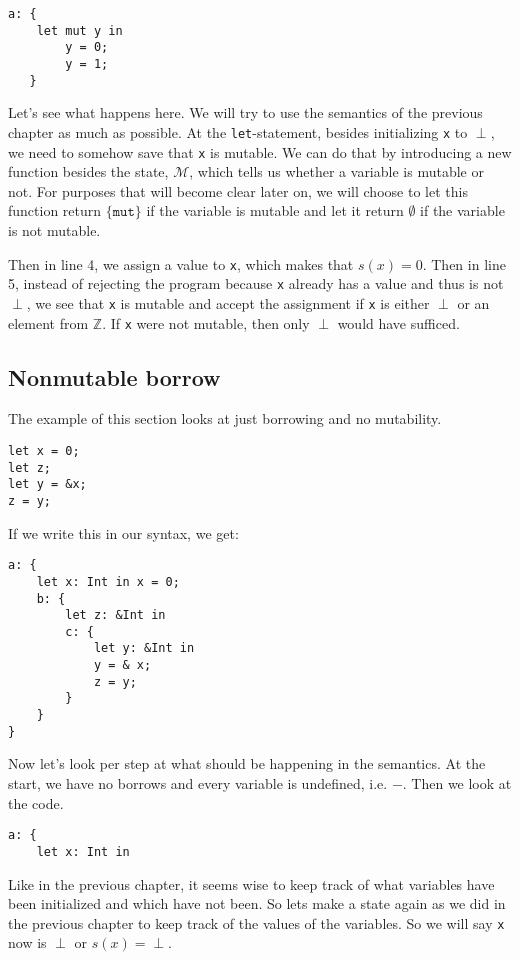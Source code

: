 \begin{verbatim}
a: {
    let mut y in 
        y = 0;
        y = 1;
   }
\end{verbatim}

Let's see what happens here. We will try to use the semantics of the previous chapter as much as possible. At the \texttt{let}-statement, besides initializing \texttt{x} to $\perp$, we need to somehow save that \texttt{x} is mutable. We can do that by introducing a new function besides the state, $\mathcal{M}$, which tells us whether a variable is mutable or not. For purposes that will become clear later on, we will choose to let this function return $\{\texttt{mut}\}$ if the variable is mutable and let it return $\emptyset$ if the variable is not mutable. 

Then in line 4, we assign a value to \texttt{x}, which makes that $s(x) = 0$. Then in line 5, instead of rejecting the program because \texttt{x} already has a value and thus is not $\perp$, we see that \texttt{x} is mutable and accept the assignment if \texttt{x} is either $\perp$ or an element from $\mathbb{Z}$. If \texttt{x} were not mutable, then only $\perp$ would have sufficed. 

\subsection{Nonmutable borrow}
The example of this section looks at just borrowing and no mutability. 
\begin{verbatim}
let x = 0;
let z;
let y = &x;
z = y;
\end{verbatim}

If we write this in our syntax, we get: 

\begin{verbatim}
a: {
    let x: Int in x = 0;
    b: {
        let z: &Int in 
        c: {
            let y: &Int in
            y = & x;
            z = y;
        }
    }
}
\end{verbatim} 

Now let's look per step at what should be happening in the semantics. At the start, we have no borrows and every variable is undefined, i.e. $-$. Then we look at the code. 

\begin{verbatim}
a: {
    let x: Int in 
\end{verbatim}

Like in the previous chapter, it seems wise to keep track of what variables have been initialized and which have not been. So lets make a state again as we did in the previous chapter to keep track of the values of the variables. So we will say \texttt{x} now is $\perp$ or $s(x) = \perp$.  

